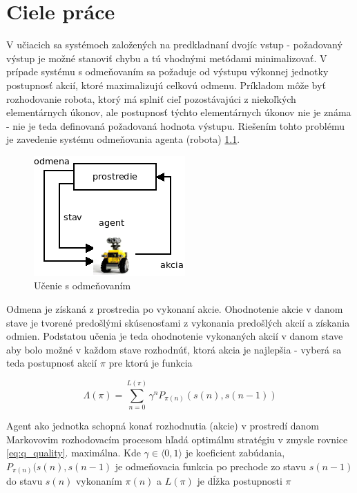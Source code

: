 \chapter{Ciele práce}

V učiacich sa systémoch založených na predkladnaní dvojíc vstup - požadovaný výstup
je možné stanoviť chybu a tú vhodnými metódami minimalizovať.
V prípade systému s odmeňovaním sa požaduje od výstupu výkonnej jednotky postupnosť
akcií, ktoré maximalizujú celkovú odmenu.
Príkladom môže byť rozhodovanie robota, ktorý má splniť cieľ pozostávajúci z
niekoľkých elementárnych úkonov, ale postupnosť týchto elementárnych úkonov nie je známa -
nie je teda definovaná požadovaná hodnota výstupu.
Riešením tohto problému je zavedenie systému odmeňovania agenta (robota) \ref{img:reinforcement_learning}.

\begin{figure}[!htb]
\center
\includegraphics[scale=.8]{../diagrams/agent.png}
\caption{Učenie s odmeňovaním}
\label{img:reinforcement_learning}
\end{figure}

Odmena je získaná z prostredia po vykonaní akcie. Ohodnotenie akcie v danom stave
je tvorené predošlými skúsenosťami z vykonania predošlých akcií a získania odmien.
Podstatou učenia je teda ohodnotenie vykonaných akcií v danom stave aby bolo
možné v každom stave rozhodnúť, ktorá akcia je najlepšia - vyberá sa teda
postupnosť akcií $\pi$ pre ktorú je funkcia

\begin{equation}
\Lambda(\pi)  = \sum\limits_{n=0}^{L(\pi)}\gamma^n P_{\pi(n)}(s(n), s(n-1))
\label{eq:q_quality}
\end{equation}

Agent ako jednotka schopná konať rozhodnutia (akcie) v prostredí danom Markovovim \cite{bib:markov_02}
rozhodovacím procesom hľadá optimálnu stratégiu v zmysle rovnice \ref{eq:q_quality}.
maximálna. Kde $\gamma \in \langle 0, 1 \rangle$ je koeficient zabúdania, $P_{\pi(n)}{(s(n), s(n-1)}$
je odmeňovacia funkcia po prechode zo stavu $s(n-1)$ do stavu $s(n)$ vykonaním $\pi(n)$ a
$L(\pi)$ je dĺžka postupnosti $\pi$



